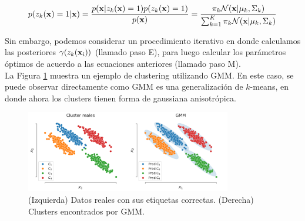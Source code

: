\begin{align}
	p(z_k(\mathbf{x})=1|\mathbf{x}) = \frac{p(\mathbf{x}|z_k(\mathbf{x})=1)p(z_k(\mathbf{x})=1)}{p(\mathbf{x})} = \frac{\pi_k {\mathcal N}(\mathbf{x}|\mu_k,\Sigma_k)}{\sum_{k=1}^K \pi_k {\mathcal N}(\mathbf{x}|\mu_k,\Sigma_k)} 
\end{align} 


Sin embargo, podemos considerar un procedimiento iterativo en donde calculamos las posteriores $\gamma(z_k(\mathbf{x}_i))$ (llamado paso E), para luego calcular los parámetros óptimos de acuerdo a las ecuaciones anteriores (llamado paso M).\\

La Figura \ref{fig:gmm} muestra un ejemplo de clustering utilizando GMM. En este caso, se puede observar directamente como GMM es una generalización de $k$-means, en donde ahora los clusters tienen forma de gaussiana anisotrópica.

\begin{figure}[ht]
  \centering
  \includegraphics[width=0.8\textwidth]{img/cap6_gmm}
  \caption{(Izquierda) Datos reales con sus etiquetas correctas. (Derecha) Clusters encontrados por GMM.}
  \label{fig:gmm}
\end{figure}

